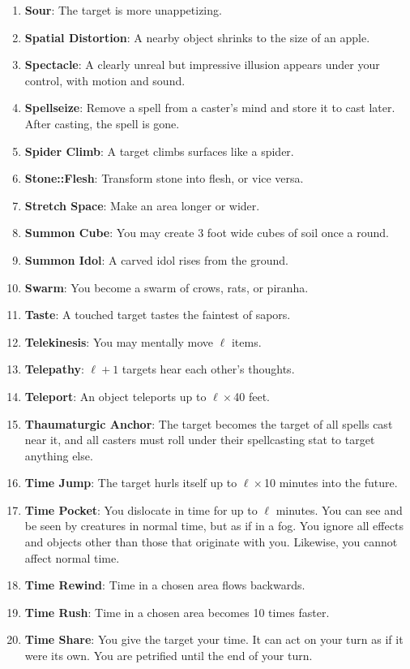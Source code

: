 \documentclass[twoside]{article}
\begin{document}
\begin{enumerate}[nosep]
\item \textbf{Sour}: The target is more unappetizing.
\item \textbf{Spatial Distortion}: A nearby object shrinks to the size of an apple.
\item \textbf{Spectacle}: A clearly unreal but impressive illusion appears under your control, with motion and sound.
\item \textbf{Spellseize}: Remove a spell from a caster's mind and store it to cast later. After casting, the spell is gone.
\item \textbf{Spider Climb}: A target climbs surfaces like a spider.
\item \textbf{Stone::Flesh}: Transform stone into flesh, or vice versa.
\item \textbf{Stretch Space}: Make an area longer or wider.
\item \textbf{Summon Cube}: You may create 3 foot wide cubes of soil once a round.
\item \textbf{Summon Idol}: A carved idol rises from the ground.
\item \textbf{Swarm}: You become a swarm of crows, rats, or piranha.
\item \textbf{Taste}: A touched target tastes the faintest of sapors.
\item \textbf{Telekinesis}: You may mentally move $\ell$ items.
\item \textbf{Telepathy}: $\ell+1$ targets hear each other's thoughts.
\item \textbf{Teleport}: An object teleports up to $\ell\times$40 feet.
\item \textbf{Thaumaturgic Anchor}: The target becomes the target of all spells cast near it, and all casters must roll under their spellcasting stat to target anything else.
\item \textbf{Time Jump}: The target hurls itself up to $\ell\times$10 minutes into the future.
\item \textbf{Time Pocket}: You dislocate in time for up to $\ell$ minutes. You can see and be seen by creatures in normal time, but as if in a fog. You ignore all effects and objects other than those that originate with you. Likewise, you cannot affect normal time.
\item \textbf{Time Rewind}: Time in a chosen area flows backwards.
\item \textbf{Time Rush}: Time in a chosen area becomes 10 times faster.
\item \textbf{Time Share}: You give the target your time. It can act on your turn as if it were its own. You are petrified until the end of your turn.

\end{enumerate}
\end{document}

